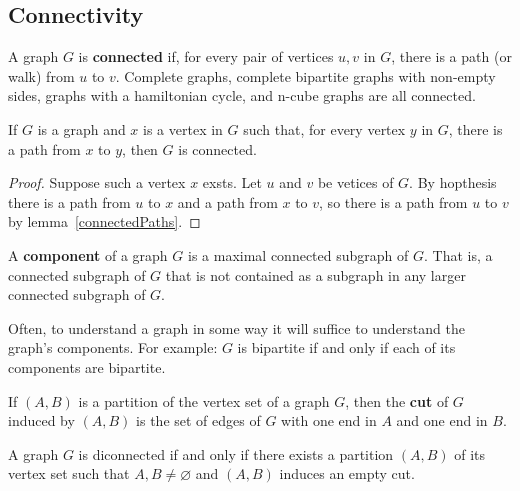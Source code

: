 \documentclass[12pt]{article}
\begin{document}
\subsection{Connectivity}
A graph $G$ is {\bf connected} if, for every pair of vertices $u,v$ in $G$, there is a path (or walk) from $u$ to $v$. Complete graphs, complete bipartite graphs with non-empty sides, graphs with a hamiltonian cycle, and n-cube graphs are all connected.

\begin{lemma}
If $G$ is a graph and $x$ is a vertex in $G$ such that, for every vertex $y$ in $G$, there is a path from $x$ to $y$, then $G$ is connected.
\end{lemma}

\begin{proof}
Suppose such a vertex $x$ exsts. Let $u$ and $v$ be vetices of $G$. By hopthesis there is a path from $u$ to $x$ and a path from $x$ to $v$, so there is a path from $u$ to $v$ by lemma~\ref{connectedPaths}.
\end{proof}

A {\bf component} of a graph $G$ is a maximal connected subgraph of $G$. That is, a connected subgraph of $G$ that is not contained as a subgraph in any larger connected subgraph of $G$.

Often, to understand a graph in some way it will suffice to understand the graph's components. For example: $G$ is bipartite if and only if each of its components are bipartite.

If $(A,B)$ is a partition of the vertex set of a graph $G$, then the {\bf cut} of $G$ induced by $(A,B)$ is the set of edges of $G$ with one end in $A$ and one end in $B$.

\begin{lemma}
A graph $G$ is diconnected if and only if there exists a partition $(A,B)$ of its vertex set such that $A,B \neq \varnothing$ and $(A,B)$ induces an empty cut.
\end{lemma}
\end{document}
